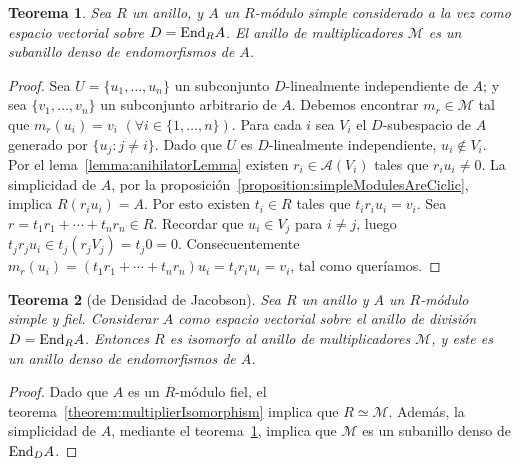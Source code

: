 \documentclass{report}
\newcommand{\End}{\textnormal{End}}
\newtheorem{theorem}{Teorema}
\begin{document}
  \begin{theorem}\label{theorem:denseMultiplierRing}
    Sea \(R\) un anillo, y \(A\) un \(R\)-módulo simple considerado a la vez como espacio vectorial sobre \(D = \End_R A\).
    El anillo de multiplicadores \(\mathcal{M}\) es un subanillo denso de endomorfismos de \(A\).
  \end{theorem}
  \begin{proof}
    Sea \(U = \{u_1, \dots, u_n\}\) un subconjunto \(D\)-linealmente independiente de \(A\);
    y sea \(\{v_1, \dots, v_n\}\) un subconjunto arbitrario de \(A\).
    Debemos encontrar \(m_r \in \mathcal{M}\) tal que \(m_r(u_i) = v_i\) \((\forall i \in \{1, \dots, n\})\).
    Para cada \(i\) sea \(V_i\) el \(D\)-subespacio de \(A\) generado por \(\{u_j : j \neq i\}\).
    Dado que \(U\) es \(D\)-linealmente independiente, \(u_i \notin V_i\).
    Por el lema~\ref{lemma:anihilatorLemma} existen \(r_i \in \mathcal{A}(V_i)\) tales que \(r_i u_i \neq 0\).
    La simplicidad de \(A\), por la proposición~\ref{proposition:simpleModulesAreCiclic}, implica \(R (r_i u_i) = A\).
    Por esto existen \(t_i \in R\) tales que \(t_i r_i u_i = v_i\).
    Sea \(r = t_1 r_1 + \cdots + t_n r_n \in R\).
    Recordar que \(u_i \in V_j\) para \(i \neq j\), luego \(t_j r_j u_i \in t_j (r_j V_j) = t_j 0 = 0\).
    Consecuentemente \(m_r(u_i) = (t_1 r_1 + \cdots + t_n r_n) u_i = t_i r_i u_i = v_i\), tal como queríamos.
  \end{proof}

  \begin{theorem}[de Densidad de Jacobson]\label{theorem:jacobsonDensityTheorem}
    Sea \(R\) un anillo y \(A\) un \(R\)-módulo simple y fiel.
    Considerar \(A\) como espacio vectorial sobre el anillo de división \(D = \End_R A\).
    Entonces \(R\) es isomorfo al anillo de multiplicadores \(\mathcal{M}\), y este es un anillo denso de endomorfismos de \(A\).
  \end{theorem}
  \begin{proof}
    Dado que \(A\) es un \(R\)-módulo fiel, el teorema~\ref{theorem:multiplierIsomorphism} implica que \(R \simeq \mathcal{M}\).
    Además, la simplicidad de \(A\), mediante el teorema~\ref{theorem:denseMultiplierRing}, implica que \(\mathcal{M}\) es un subanillo denso de \(\End_D A\).
  \end{proof}
\end{document}
